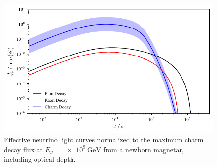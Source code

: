 \begin{figure}[H]
	\centering
	\includegraphics{../plots/build/magnetar_neutrino_spectrum_with.pdf}
	\caption[Magnetar $\nu \kern+0.5pt$ flux compared to $c$ decay with optical depth.]
			{Effective neutrino light curves normalized to the maximum charm decay flux at
			 $E_\nu = \qty{e9}{\giga\electronvolt}$ from a newborn magnetar, including optical depth.}
	\label{fig:magnetar-flux-with}
\end{figure}
